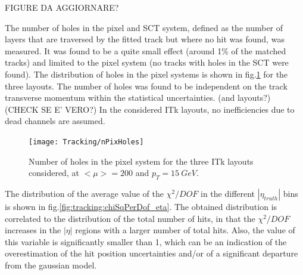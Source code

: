 \documentclass[a4paper,twoside,12pt]{article}
\begin{document}
\begin{table} [h]
\centering
	\caption{Average number of pixel, SCT and total hits in the three ITk layouts considered.}
	\label{tab:tracking:nHits}
\end{table}

FIGURE DA AGGIORNARE?
 
The number of holes in the pixel and SCT system, defined as the number of layers that are traversed by the fitted track but where no hit was found, was measured. It was found to be
a quite small effect (around 1\% of the matched tracks) and limited to the pixel system (no tracks with holes in the SCT were found). The distribution of holes in the pixel systems is shown in fig.\ref{fig:tracking:nHoles} for the three 
layouts. The number of holes was found to be independent on the track transverse momentum within the statistical uncertainties. (and layouts?) (CHECK SE E' VERO?) In the
considered ITk layouts, no inefficiencies due to dead channels are assumed. \\

\begin{figure}
\centering
\texttt{[image: Tracking/nPixHoles]}
\caption{Number of holes in the pixel system for the three ITk layouts considered, at $<\mu> = 200$ and $p_{T} = 15\ GeV$.}
\label{fig:tracking:nHoles}
\end{figure}

The distribution of the average value of the $\chi^{2}/DOF$ in the different $|\eta_{truth}|$ bins is shown in fig.\ref{fig:tracking:chiSqPerDof_eta}. The obtained distribution 
is correlated to the distribution of the total number of hits, in that the $\chi^{2}/DOF$ increases in the $|\eta|$ regions with a larger number of total hits. Also, the value of this variable
is significantly smaller than 1, which can be an indication of the overestimation of the hit position uncertainties and/or of a significant departure from the gaussian model.
\end{document}
